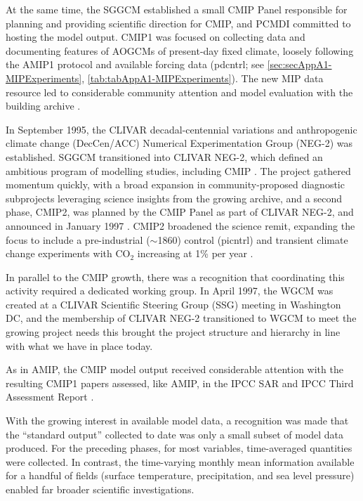\documentclass[manuscript]{copernicus}
\begin{document}
At the same time, the SGGCM established a small CMIP Panel responsible for planning and providing scientific direction for CMIP, and PCMDI committed to hosting the model output. CMIP1 was focused on collecting data and documenting features of AOGCMs of present-day fixed climate, loosely following the AMIP1 protocol and available forcing data (pdcntrl; see \autoref{sec:secAppA1-MIPExperiments}, \autoref{tab:tabAppA1-MIPExperiments}). The new MIP data resource led to considerable community attention and model evaluation with the building archive \citep{lambert_cmip1_2001,raisanen_co2-induced_2001,villwock_6th_2003}.

In September 1995, the CLIVAR decadal-centennial variations and anthropogenic climate change (DecCen/ACC) Numerical Experimentation Group (NEG-2) was established. SGGCM transitioned into CLIVAR NEG-2, which defined an ambitious program of modelling studies, including CMIP \citep{coughlan_report_1996,villwock_what_1996}. The project gathered momentum quickly, with a broad expansion in community-proposed diagnostic subprojects leveraging science insights from the growing archive, and a second phase, CMIP2, was planned by the CMIP Panel as part of CLIVAR NEG-2, and announced in January 1997 \citep{meehl_intercomparison_1997,meehl_coupled_2000}. CMIP2 broadened the science remit, expanding the focus to include a pre-industrial ($\sim$1860) control (picntrl) and transient climate change experiments with CO$_{2}$ increasing at 1\% per year \citep[1pctCO2, see \autoref{tab:tabAppA1-MIPExperiments};][]{covey_overview_2003,meehl_cmip_2003,villwock_6th_2003}.

In parallel to the CMIP growth, there was a recognition that coordinating this activity required a dedicated working group. In April 1997, the WGCM was created at a CLIVAR Scientific Steering Group (SSG) meeting in Washington DC, and the membership of CLIVAR NEG-2 transitioned to WGCM to meet the growing project needs \citep{detemmerman_clivar_1997} this brought the project structure and hierarchy in line with what we have in place today.

As in AMIP, the CMIP model output received considerable attention with the resulting CMIP1 papers assessed, like AMIP, in the IPCC SAR \citep{gates_climate_1996} and IPCC Third Assessment Report \citep[TAR;][]{mcavaney_model_2001}.

With the growing interest in available model data, a recognition was made that the ``standard output'' collected to date was only a small subset of model data produced. For the preceding phases, for most variables, time-averaged quantities were collected. In contrast, the time-varying monthly mean information available for a handful of fields (surface temperature, precipitation, and sea level pressure) enabled far broader scientific investigations.
\end{document}

